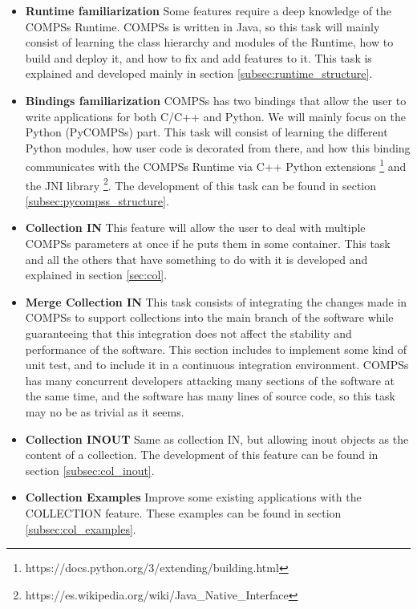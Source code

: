 \begin{itemize}
\item \textbf{Runtime familiarization} Some features require a deep knowledge of the COMPSs Runtime. COMPSs is written in Java, so this task will mainly consist of learning the class hierarchy and modules of the Runtime, how to build and deploy it, and how to fix and add features to it. This task is explained and developed mainly in section \ref{subsec:runtime_structure}.

\item \textbf{Bindings familiarization} COMPSs has two bindings that allow the user to write applications for both C/C++ and Python. We will mainly focus on the Python (PyCOMPSs) part. This task will consist of learning the different Python modules, how user code is decorated from there, and how this binding communicates with the COMPSs Runtime via C++ Python extensions \footnote{https://docs.python.org/3/extending/building.html} and the JNI library \footnote{https://es.wikipedia.org/wiki/Java\_Native\_Interface}. The development of this task can be found in section \ref{subsec:pycompss_structure}.

\item \textbf{Collection IN} This feature will allow the user to deal with multiple COMPSs parameters at once if he puts them in some container. This task and all the others that have something to do with it is developed and explained in section \ref{sec:col}.

\item \textbf{Merge Collection IN} This task consists of integrating the changes made in COMPSs to support collections into the main branch of the software while guaranteeing that this integration does not affect the stability and performance of the software. This section includes to implement some kind of unit test, and to include it in a continuous integration environment. COMPSs has many concurrent developers attacking many sections of the software at the same time, and the software has many lines of source code, so this task may no be as trivial as it seems.

\item \textbf{Collection INOUT} Same as collection IN, but allowing inout objects as the content of a collection. The development of this feature can be found in section \ref{subsec:col_inout}.

\item \textbf{Collection Examples} Improve some existing applications with the COLLECTION feature. These examples can be found in section \ref{subsec:col_examples}.


\end{itemize}
